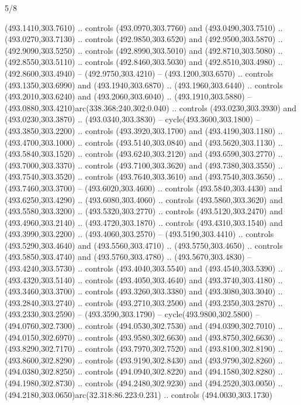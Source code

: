 \begin{flagdescription}{5/8}
\begin{scope}[xshift=0.5\flaglength,yshift=0.5\flagwidth,scale=\flagwidth/475.63]
\begin{scope}[y=0.8pt, x=0.8pt, yscale=-1, xscale=1,shift={(-450,-300)}]
\begin{scope}[cm={{1.0,0.0,0.0,1.0,(-0.0002,0.12556)}},cm={{1.0,0.0,0.0,1.0,(0.00179,0.0)}}]
\begin{scope}[cm={{1.11592,0.0,0.0,1.11592,(-106.89933,-41.77764)}}]
\begin{scope}[draw=black,fill=cfff]
\begin{scope}[fill=black]
  (493.1410,303.7610) .. controls (493.0970,303.7760) and (493.0490,303.7510) ..
  (493.0270,303.7130) .. controls (492.9850,303.6520) and (492.9500,303.5870) ..
  (492.9090,303.5250) .. controls (492.8990,303.5010) and (492.8710,303.5080) ..
  (492.8550,303.5110) .. controls (492.8460,303.5030) and (492.8510,303.4980) ..
  (492.8600,303.4940) -- (492.9750,303.4210) -- (493.1200,303.6570) .. controls
  (493.1350,303.6990) and (493.1940,303.6870) .. (493.1960,303.6440) .. controls
  (493.2010,303.6240) and (493.2060,303.6040) .. (493.1910,303.5880) --
  (493.0880,303.4210)arc(338.368:240.302:0.040) .. controls (493.0230,303.3930)
  and (493.0230,303.3870) .. (493.0340,303.3830) -- cycle(493.3600,303.1800) --
  (493.3850,303.2200) .. controls (493.3920,303.1700) and (493.4190,303.1180) ..
  (493.4700,303.1000) .. controls (493.5140,303.0840) and (493.5620,303.1130) ..
  (493.5840,303.1520) .. controls (493.6240,303.2120) and (493.6590,303.2770) ..
  (493.7000,303.3370) .. controls (493.7100,303.3620) and (493.7380,303.3550) ..
  (493.7540,303.3520) .. controls (493.7640,303.3610) and (493.7540,303.3650) ..
  (493.7460,303.3700) -- (493.6020,303.4600) .. controls (493.5840,303.4430) and
  (493.6250,303.4290) .. (493.6080,303.4060) .. controls (493.5860,303.3620) and
  (493.5580,303.3200) .. (493.5320,303.2770) .. controls (493.5120,303.2470) and
  (493.4960,303.2140) .. (493.4720,303.1870) .. controls (493.4310,303.1540) and
  (493.3990,303.2200) .. (493.4060,303.2570) -- (493.5190,303.4410) .. controls
  (493.5290,303.4640) and (493.5560,303.4710) .. (493.5750,303.4650) .. controls
  (493.5850,303.4740) and (493.5760,303.4780) .. (493.5670,303.4830) --
  (493.4240,303.5730) .. controls (493.4040,303.5540) and (493.4540,303.5390) ..
  (493.4320,303.5140) .. controls (493.4050,303.4640) and (493.3740,303.4180) ..
  (493.3460,303.3700) .. controls (493.3260,303.3380) and (493.3080,303.3040) ..
  (493.2840,303.2740) .. controls (493.2710,303.2500) and (493.2350,303.2870) ..
  (493.2330,303.2590) -- (493.3590,303.1790) -- cycle(493.9800,302.5800) --
  (494.0760,302.7300) .. controls (494.0530,302.7530) and (494.0390,302.7010) ..
  (494.0150,302.6970) .. controls (493.9580,302.6630) and (493.8750,302.6630) ..
  (493.8290,302.7170) .. controls (493.7970,302.7520) and (493.8100,302.8190) ..
  (493.8600,302.8290) .. controls (493.9190,302.8430) and (493.9790,302.8260) ..
  (494.0380,302.8250) .. controls (494.0940,302.8220) and (494.1580,302.8280) ..
  (494.1980,302.8730) .. controls (494.2480,302.9230) and (494.2520,303.0050) ..
  (494.2180,303.0650)arc(32.318:86.223:0.231) .. controls (494.0030,303.1730)

\end{scope}
\end{scope}
\end{scope}
\end{scope}
\end{scope}
\end{scope}
\end{flagdescription}
